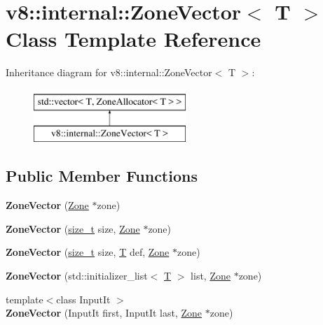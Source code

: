 \hypertarget{classv8_1_1internal_1_1ZoneVector}{}\section{v8\+:\+:internal\+:\+:Zone\+Vector$<$ T $>$ Class Template Reference}
\label{classv8_1_1internal_1_1ZoneVector}
Inheritance diagram for v8\+:\+:internal\+:\+:Zone\+Vector$<$ T $>$\+:\begin{figure}[H]
\begin{center}
\leavevmode
\includegraphics[height=2.000000cm]{classv8_1_1internal_1_1ZoneVector}
\end{center}
\end{figure}
\subsection*{Public Member Functions}
\begin{DoxyCompactItemize}
\item 
\mbox{\label{classv8_1_1internal_1_1ZoneVector_aacedddc9e2a268b48886c5c32b8ee22b}} 
{\bfseries Zone\+Vector} (\mbox{\hyperlink{classv8_1_1internal_1_1Zone}{Zone}} $\ast$zone)
\item 
\mbox{\label{classv8_1_1internal_1_1ZoneVector_afe4d9a1b62d89a7d03998073bf94597e}} 
{\bfseries Zone\+Vector} (\mbox{\hyperlink{classsize__t}{size\+\_\+t}} size, \mbox{\hyperlink{classv8_1_1internal_1_1Zone}{Zone}} $\ast$zone)
\item 
\mbox{\label{classv8_1_1internal_1_1ZoneVector_a9beed42288384ab6bf5aa0d48c7497e0}} 
{\bfseries Zone\+Vector} (\mbox{\hyperlink{classsize__t}{size\+\_\+t}} size, \mbox{\hyperlink{classv8_1_1internal_1_1torque_1_1T}{T}} def, \mbox{\hyperlink{classv8_1_1internal_1_1Zone}{Zone}} $\ast$zone)
\item 
\mbox{\label{classv8_1_1internal_1_1ZoneVector_aabf185a2b498115ba0e320217a0c30f2}} 
{\bfseries Zone\+Vector} (std\+::initializer\+\_\+list$<$ \mbox{\hyperlink{classv8_1_1internal_1_1torque_1_1T}{T}} $>$ list, \mbox{\hyperlink{classv8_1_1internal_1_1Zone}{Zone}} $\ast$zone)
\item 
\mbox{\label{classv8_1_1internal_1_1ZoneVector_af3460dcef8cb741e3f6bc2ed6b9b3e0e}} 
{\footnotesize template$<$class Input\+It $>$ }\\{\bfseries Zone\+Vector} (Input\+It first, Input\+It last, \mbox{\hyperlink{classv8_1_1internal_1_1Zone}{Zone}} $\ast$zone)
\end{DoxyCompactItemize}



